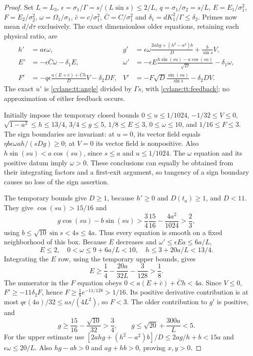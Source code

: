 \begin{proof}
Set $L=L_3$, $\epsilon=\sigma_1/\Gamma=s/(L\sin s)\leq2/L$,
$q=\sigma_1/\sigma_2=s/L$, $E=E_1/\sigma_1^2$,
$F=E_2/\sigma_2^2$, $\omega=\Omega_1/\sigma_1$,
$\bar c=c/\sigma_1^2$, $\bar C=C/\sigma_1^2$ and
$\delta_1=dK_1^2/\Gamma\leq\delta_2$.
Primes now mean $d/d\tau$ exclusively. The exact dimensionless
older equations, retaining each physical ratio, are
\begin{align}\label{cvlane:tt:scaled}
 h'&=a\epsilon\omega,&
 g'&=\epsilon\omega\frac{2ahg+(h^2-a^2)b}{D}
                    +\frac b{\sin s}V,\\
 E'&=-\epsilon\bar C\omega-\delta_1E,&
 \omega'&=-\epsilon E\frac{h\sin(su)-a\cos(su)}{\sqrt D}
                      -\delta_1\omega,\nonumber\\
 F'&=-q\epsilon\frac{a(E+\bar c)+\bar Ch}{D}V
                      -\delta_2DF,&
 V'&=-F\sqrt D\frac{\sin(su)}{\sin s}-\delta_2DV.\nonumber
\end{align}
The exact $u'$ is \eqref{cvlane:tt:angle} divided by $\Gamma s$,
with \eqref{cvlane:tt:feedback}; no approximation of either feedback occurs.

Initially impose the temporary closed bounds
$0\leq u\leq1/1024$, $-1/32\leq V\leq0$,
$\sqrt{1-a^2}\leq h\leq13/4$, $3/4\leq g\leq5$,
$1/8\leq E\leq3$, $0\leq\omega\leq10$, and $1/16\leq F\leq3$.
The sign boundaries are invariant: at $u=0$, its vector field equals
$\eta b\epsilon\omega ah/(sDg)\geq0$; at $V=0$ its vector field
is nonpositive. Also
$h\sin(su)<a\cos(su)$, since $s\leq a$ and $u\leq1/1024$.
The $\omega$ equation and its positive datum imply $\omega>0$.
These conclusions can equally be obtained from their integrating
factors and a first-exit argument, so tangency of a sign boundary
causes no loss of the sign assertion.

The temporary bounds give $D\geq1$, because $h'\geq0$ and
$D(t_a)\geq1$, and $D<11$. They give
$\cos(su)>15/16$ and
\[
 g\cos(su)-b\sin(su)
 >\frac34\frac{15}{16}-\frac{4a^2}{1024}>\frac23,
\]
using $b\leq\sqrt{10}\sin s<4s\leq4a$.
Thus every equation is smooth on a fixed neighborhood of this box.
Because $E$ decreases and $\omega'\leq\epsilon E a\leq6a/L$,
\[
 E\leq2,\quad 0<\omega\leq9+6a/L<10,\quad
 h\leq3+20a/L<13/4.
\]
Integrating the $E$ row, using the temporary upper bounds, gives
\[
 E\geq\frac14-\frac{20a}{32L}-\frac3{128}>\frac18.
\]
The numerator in the $F$ equation obeys
$0<a(E+\bar c)+\bar Ch<4a$. Since $V\leq0$,
$F'\geq-11\delta_2F$, hence
$F\geq\tfrac18e^{-11/128}>1/16$.
Its positive derivative contribution is at most
$q\epsilon(4a)/32\leq as/(4L^2)$, so $F<3$.
The older contribution to $g'$ is positive, and
\[
 g\geq\frac{15}{16}-\frac{\sqrt{10}}{32}>\frac34,
 \qquad
 g\leq\sqrt{20}+\frac{300a}{L}<5.
\]
For the upper estimate use
$[2ahg+(h^2-a^2)b]/D\leq2ag/h+b<15a$
and $\epsilon\omega\leq20/L$.
Also $hg-ab>0$ and $ag+hb>0$, proving $x,y>0$.


\end{proof}
